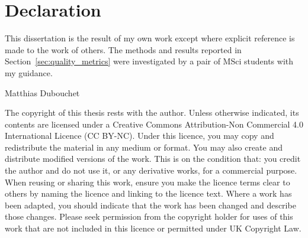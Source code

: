 
\chapter*{Declaration}
This dissertation is the result of my own work except where explicit reference
is made to the work of others. 
The methods and results reported in Section~\ref{sec:quality_metrics} were
investigated by a pair of MSci students with my guidance.

\hfill Matthias Dubouchet

\vspace{2cm}
The copyright of this thesis rests with the author. Unless otherwise indicated, 
its contents are licensed under a Creative Commons Attribution-Non 
Commercial 4.0 International Licence (CC BY-NC). 
Under this licence, you may copy and redistribute the material in any medium 
or format. You may also create and distribute modified versions of the work. 
This is on the condition that: you credit the author and do not use it, or any 
derivative works, for a commercial purpose. 
When reusing or sharing this work, ensure you make the licence terms clear to 
others by naming the licence and linking to the licence text. Where a work has 
been adapted, you should indicate that the work has been changed and 
describe those changes. 
Please seek permission from the copyright holder for uses of this work that are 
not included in this licence or permitted under UK Copyright Law.
